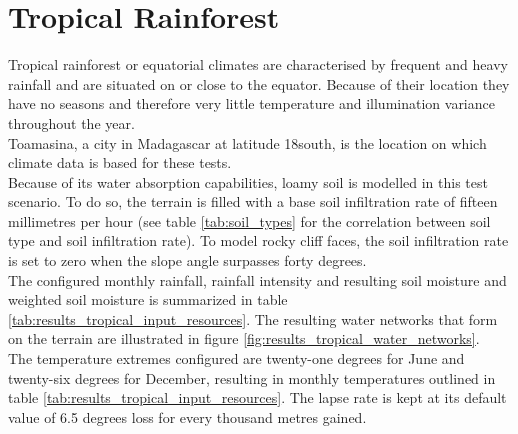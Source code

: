 \section{Tropical Rainforest} \label{sec:results_trop_rainforest}

Tropical rainforest or equatorial climates are characterised by frequent and heavy rainfall and are situated on or close to the equator. Because of their location they have no seasons and therefore very little temperature and illumination variance throughout the year.\\

Toamasina, a city in Madagascar at latitude 18\textdegree south, is the location on which climate data is based for these tests.\\

Because of its water absorption capabilities, loamy soil is modelled in this test scenario. To do so, the terrain is filled with a base soil infiltration rate of fifteen millimetres per hour (see table \ref{tab:soil_types} for the correlation between soil type and soil infiltration rate). To model rocky cliff faces, the soil infiltration rate is set to zero when the slope angle surpasses forty degrees.\\

The configured monthly rainfall, rainfall intensity and resulting soil moisture and weighted soil moisture is summarized in table \ref{tab:results_tropical_input_resources}. The resulting water networks that form on the terrain are illustrated in figure \ref{fig:results_tropical_water_networks}.\\

The temperature extremes configured are twenty-one degrees for June and twenty-six degrees for December, resulting in monthly temperatures outlined in table \ref{tab:results_tropical_input_resources}. The lapse rate is kept at its default value of 6.5 degrees loss for every thousand metres gained. \\

